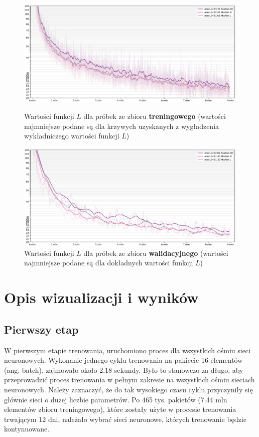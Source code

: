 \begin{figure}[h!]
    \centering
    \includegraphics[width=\linewidth]{loss_centerlines_train.png}
    \caption{Wartości funkcji $L$ dla próbek ze zbioru \textbf{treningowego} (wartości najmniejsze podane są dla krzywych uzyskanych z wygładzenia wykładniczego wartości funkcji $L$)}
    \vspace*{1cm}
    \includegraphics[width=\linewidth]{loss_centerlines_val.png}
    \caption{Wartości funkcji $L$ dla próbek ze zbioru \textbf{walidacyjnego} (wartości najmniejsze podane są dla dokładnych wartości funkcji $L$)}
\end{figure}

\newpage

\section{Opis wizualizacji i wyników}

\subsection{Pierwszy etap}

W pierwszym etapie trenowania, uruchomiono proces dla wszystkich ośmiu sieci neuronowych. Wykonanie jednego cyklu trenowania na pakiecie 16 elementów (ang. batch), zajmowało około 2.18 sekundy. Było to stanowczo za długo, aby przeprowadzić proces trenowania w pełnym zakresie na wszystkich ośmiu sieciach neuronowych. Należy zaznaczyć, że do tak wysokiego czasu cyklu przyczyniły się głównie sieci o dużej liczbie parametrów. Po 465 tys. pakietów (7.44 mln elementów zbioru treningowego), które zostały użyte w procesie trenowania trwającym 12 dni, należało wybrać sieci neuronowe, których trenowanie będzie kontynuowane.

